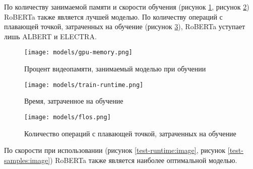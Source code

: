 По количеству занимаемой памяти и скорости обучения (рисунок \ref{gpu-memory:image}, рисунок \ref{train-runtime:image}) RoBERTa 
также является лучшей моделью. По количеству операций с плавающей точкой, затраченных на обучение 
(рисунок \ref{flos:image}), RoBERTa уступает лишь ALBERT и ELECTRA.  

\begin{figure}[H]
   \begin{center}
      \texttt{[image: models/gpu-memory.png]}
      \caption{Процент видеопамяти, занимаемый моделью при обучении}
      \label{gpu-memory:image}
   \end{center}
\end{figure}

\begin{figure}[H]
   \begin{center}
      \texttt{[image: models/train-runtime.png]}
      \caption{Время, затраченное на обучение}
      \label{train-runtime:image}
   \end{center}
\end{figure}

\begin{figure}[H]
   \begin{center}
      \texttt{[image: models/flos.png]}
      \caption{Количество операций с плавающей точкой, затраченных на обучение}
      \label{flos:image}
   \end{center}
\end{figure}

По скорости при использовании (рисунок \ref{test-runtime:image}, рисунок \ref{test-samples:image}) RoBERTa также является наиболее оптимальной моделью. 



